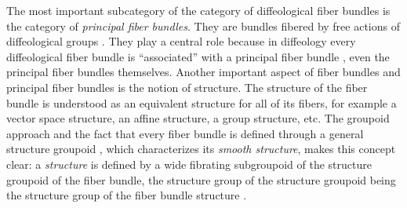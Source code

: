 \begin{sechead}
  The most important subcategory of the category of diffeological fiber bundles is the category of {\em principal fiber bundles}.
  They are bundles fibered by free actions of diffeological groups .
  They play a central role because in diffeology every diffeological fiber bundle is ``associated'' with a principal fiber bundle ,
  even the principal fiber bundles themselves.
  Another important aspect of fiber bundles and principal fiber bundles is the notion of structure.
  The structure of the fiber bundle is understood as an equivalent structure for all of its fibers,
  for example a vector space structure,
  an affine structure, a group structure, etc.
  The groupoid approach and the fact that every fiber bundle is defined through a general structure groupoid ,
  which characterizes its {\em smooth structure},
  makes this concept clear:
  a {\em structure} is defined by a wide fibrating subgroupoid of the structure groupoid of the fiber bundle,
  the structure group of the structure groupoid being the  structure group of the fiber bundle structure .
\end{sechead}

